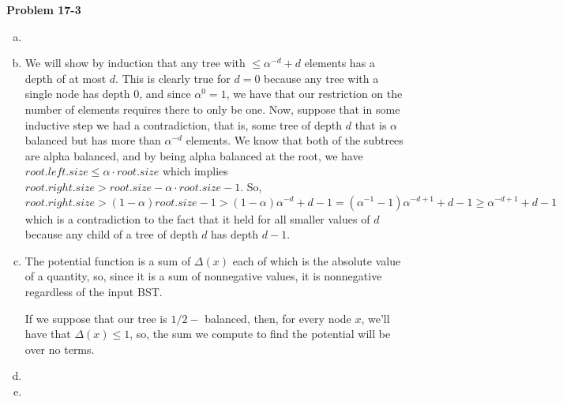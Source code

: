 \documentclass{article}
\begin{document}
\noindent\textbf{Problem 17-3}\\
\begin{enumerate}[a.]%
\item

\item
We will show by induction that any tree with $\le \alpha^{-d}+d$ elements has a depth of at most $d$. This is clearly true for $d=0$ because any tree with a single node has depth 0, and since $\alpha^0 = 1$, we have that our restriction on the number of elements requires there to only be one. Now, suppose that in some inductive step we had a contradiction, that is, some tree of depth $d$ that is $\alpha$ balanced but has more than $\alpha^{-d}$ elements. We know that both of the subtrees are alpha balanced, and by being alpha balanced at the root, we have $root.left.size \le \alpha \cdot root.size$ which implies $root.right.size > root.size - \alpha \cdot root.size -1$. So, $root.right.size > (1-\alpha) root.size -1 > (1-\alpha) \alpha^{-d} + d-1 = (\alpha^{-1} -1)\alpha^{-d+1} + d-1 \ge \alpha^{-d+1}+d-1$ which is a contradiction to the fact that it held for all smaller values of $d$ because any child of a tree of depth $d$ has depth $d-1$.  
 \item
The potential function is a sum of $\Delta(x)$ each of which is the absolute value of a quantity, so, since it is a sum of nonnegative values, it is nonnegative regardless of the input BST.

If we suppose that our tree is $1/2-$ balanced, then, for every node $x$, we'll have that $\Delta(x) \le 1$, so, the sum we compute to find the potential will be over no terms.
 
 \item
 
 
 \item
 
\end{enumerate}
\end{document}
